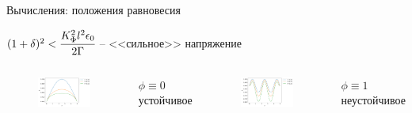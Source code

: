 \begin{frame}{Вычисления: положения равновесия}
\vspace{-0.4cm}
\begin{center}
	$(1 + \delta)^2 < \cfrac{K_\Phi^2 l^2 \epsilon_0}{2 \Gamma}$ -- <<сильное>> напряжение
\end{center}
\vspace{-0.4cm}
\begin{columns}
\begin{figure}
	\includegraphics[width=\textwidth]{figures/equilibrium_3_0.png}
\end{figure}
\vspace{-0.6cm}
\begin{center}
	$\phi \equiv 0$ \\
	устойчивое
\end{center}
\begin{figure}
	\includegraphics[width=\textwidth]{figures/equilibrium_3_1.png}
\end{figure}
\vspace{-0.6cm}
\begin{center}
	$\phi \equiv 1$ \\
	неустойчивое
\end{center}
\end{columns}
\end{frame}


